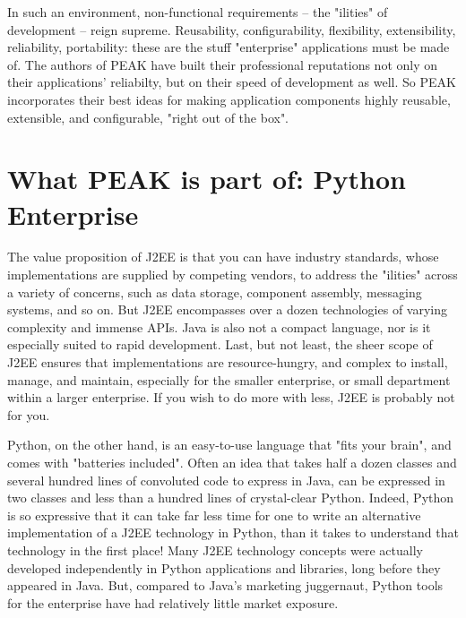 In such an environment, non-functional requirements -- the "ilities" of
development -- reign supreme. Reusability, configurability, flexibility,
extensibility, reliability, portability: these are the stuff
"enterprise" applications must be made of. The authors of PEAK have
built their professional reputations not only on their applications'
reliabilty, but on their speed of development as well. So PEAK
incorporates their best ideas for making application components highly
reusable, extensible, and configurable, "right out of the box". 


\section{What PEAK is part of: Python Enterprise} 

The value proposition of J2EE is that you can have industry standards,
whose implementations are supplied by competing vendors, to address
the "ilities" across a variety of concerns, such as data storage,
component assembly, messaging systems, and so on.  But J2EE encompasses
over a dozen technologies of varying complexity and immense APIs.  Java
is also not a compact language, nor is it especially suited to rapid
development.  Last, but not least, the sheer scope of J2EE ensures that
implementations are resource-hungry, and complex to install, manage, and
maintain, especially for the smaller enterprise, or small department
within a larger enterprise.  If you wish to do more with less, J2EE is
probably not for you. 

Python, on the other hand, is an easy-to-use language that "fits your
brain", and comes with "batteries included".  Often an idea that takes
half a dozen classes and several hundred lines of convoluted code to
express in Java, can be expressed in two classes and less than a hundred
lines of crystal-clear Python.  Indeed, Python is so expressive that it
can take far less time for one to write an alternative implementation of
a J2EE technology in Python, than it takes to understand that technology
in the first place!  Many J2EE technology concepts were actually
developed independently in Python applications and libraries, long
before they appeared in Java.  But, compared to Java's marketing
juggernaut, Python tools for the enterprise have had relatively little
market exposure. 

